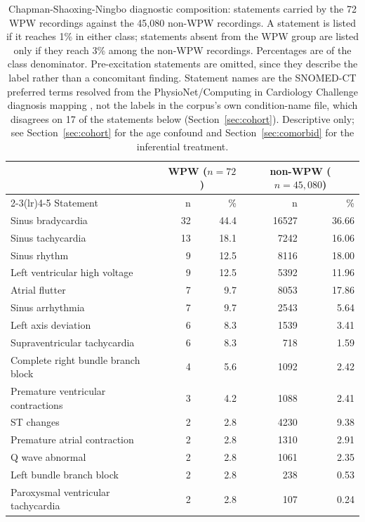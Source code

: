 \documentclass[11pt]{article}
\begin{document}
\begin{table}[htbp]
\centering
\footnotesize
\caption{Chapman-Shaoxing-Ningbo diagnostic composition: statements carried by the 72 WPW recordings against the 45{,}080 non-WPW recordings. A statement is listed if it reaches 1\% in either class; statements absent from the WPW group are listed only if they reach 3\% among the non-WPW recordings. Percentages are of the class denominator. Pre-excitation statements are omitted, since they describe the label rather than a concomitant finding. Statement names are the SNOMED-CT preferred terms resolved from the PhysioNet/Computing in Cardiology Challenge diagnosis mapping \cite{georgia}, not the labels in the corpus's own condition-name file, which disagrees on 17 of the statements below (Section~\ref{sec:cohort}). Descriptive only; see Section~\ref{sec:cohort} for the age confound and Section~\ref{sec:comorbid} for the inferential treatment.}
\label{tab:comorbid-csn}
\begin{tabular}{lrrrr}
\toprule
 & \multicolumn{2}{c}{WPW ($n=72$)} & \multicolumn{2}{c}{non-WPW ($n=45{,}080$)} \\
\cmidrule(lr){2-3}\cmidrule(lr){4-5}
Statement & n & \% & n & \% \\
\midrule
Sinus bradycardia & 32 & 44.4 & 16527 & 36.66 \\
Sinus tachycardia & 13 & 18.1 & 7242 & 16.06 \\
Sinus rhythm & 9 & 12.5 & 8116 & 18.00 \\
Left ventricular high voltage & 9 & 12.5 & 5392 & 11.96 \\
Atrial flutter & 7 & 9.7 & 8053 & 17.86 \\
Sinus arrhythmia & 7 & 9.7 & 2543 & 5.64 \\
Left axis deviation & 6 & 8.3 & 1539 & 3.41 \\
Supraventricular tachycardia & 6 & 8.3 & 718 & 1.59 \\
Complete right bundle branch block & 4 & 5.6 & 1092 & 2.42 \\
Premature ventricular contractions & 3 & 4.2 & 1088 & 2.41 \\
ST changes & 2 & 2.8 & 4230 & 9.38 \\
Premature atrial contraction & 2 & 2.8 & 1310 & 2.91 \\
Q wave abnormal & 2 & 2.8 & 1061 & 2.35 \\
Left bundle branch block & 2 & 2.8 & 238 & 0.53 \\
Paroxysmal ventricular tachycardia & 2 & 2.8 & 107 & 0.24 \\

\end{tabular}
\end{table}
\end{document}
